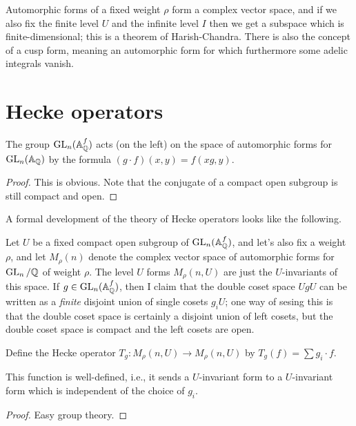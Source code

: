 Automorphic forms of a fixed weight $\rho$ form a complex vector space, and if we also
fix the finite level $U$ and the infinite level $I$ then we get a subspace which is
finite-dimensional; this is a theorem of Harish-Chandra. There is also the concept
of a cusp form, meaning an automorphic form for which furthermore some adelic integrals
vanish.

\section{Hecke operators}

\begin{lemma} The group $\operatorname{GL}_n(\mathbb{A}_{\mathbb{Q}}^f)$ acts (on the left) on the space of automorphic forms
  for $\operatorname{GL}_n(\mathbb{A}_{\mathbb{Q}})$ by the formula $(g\cdot f)(x,y)=f(xg,y)$.
\end{lemma}
\begin{proof}
  This is obvious. Note that the conjugate of a compact open subgroup is still
  compact and open.
\end{proof}

A formal development of the theory of Hecke operators looks like the following.

Let $U$ be a fixed compact open subgroup of $\operatorname{GL}_n(\mathbb{A}_{\mathbb{Q}}^f)$, and let's also fix
a weight $\rho$, and let $M_\rho(n)$ denote the complex vector space of automorphic
forms for $\operatorname{GL}_n/\mathbb{Q}$ of weight $\rho$. The level $U$ forms $M_\rho(n,U)$ are just the $U$-invariants
of this space. If $g\in\operatorname{GL}_n(\mathbb{A}_{\mathbb{Q}}^f)$, then I
claim that the double coset space $UgU$ can be written as a \emph{finite} disjoint union
of single cosets $g_iU$; one way of sesing this is that the double coset space is certainly
a disjoint union of left cosets, but the double coset space is compact and the left cosets
are open.

Define the Hecke operator $T_g:M_\rho(n,U)\to M_\rho(n,U)$ by
$T_g(f)=\sum g_i\cdot f$.

\begin{lemma} This function is well-defined, i.e., it sends a $U$-invariant form to
  a $U$-invariant form which is independent of the choice of $g_i$.
\end{lemma}
\begin{proof} Easy group theory.
\end{proof}

